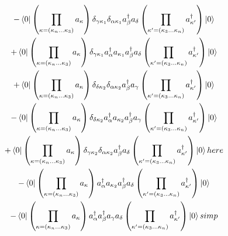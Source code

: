 \documentclass[12pt]{article}
\begin{document}
\begin{multline}
    -\bra{0}\left(\prod_{\kappa=\left(\kappa_{n}\dots\kappa_{3}\right)}a_{\kappa}\right)
        \delta_{\gamma\kappa_{1}}\delta_{\alpha\kappa_{1}}a^{\dag}_{\beta}a_{\delta}
    \left(\prod_{\kappa^{\prime}=\left(\kappa_{3}\dots\kappa_{n}\right)}a^{\dag}_{\kappa^{\prime}}\right)\ket{0}\\
    +\bra{0}\left(\prod_{\kappa=\left(\kappa_{n}\dots\kappa_{3}\right)}a_{\kappa}\right)
        \delta_{\gamma\kappa_{1}}a^{\dag}_{\alpha}a_{\kappa_{1}}a^{\dag}_{\beta}a_{\delta}
    \left(\prod_{\kappa^{\prime}=\left(\kappa_{3}\dots\kappa_{n}\right)}a^{\dag}_{\kappa^{\prime}}\right)\ket{0}\\
    +\bra{0}\left(\prod_{\kappa=\left(\kappa_{n}\dots\kappa_{3}\right)}a_{\kappa}\right)
        \delta_{\delta\kappa_{2}}\delta_{\alpha\kappa_{2}}a^{\dag}_{\beta}a_{\gamma}
    \left(\prod_{\kappa^{\prime}=\left(\kappa_{3}\dots\kappa_{n}\right)}a^{\dag}_{\kappa^{\prime}}\right)\ket{0}\\
    -\bra{0}\left(\prod_{\kappa=\left(\kappa_{n}\dots\kappa_{3}\right)}a_{\kappa}\right)
        \delta_{\delta\kappa_{2}}a^{\dag}_{\alpha}a_{\kappa_{2}}a^{\dag}_{\beta}a_{\gamma}
    \left(\prod_{\kappa^{\prime}=\left(\kappa_{3}\dots\kappa_{n}\right)}a^{\dag}_{\kappa^{\prime}}\right)\ket{0}\\
    +\bra{0}\left(\prod_{\kappa=\left(\kappa_{n}\dots\kappa_{3}\right)}a_{\kappa}\right)
        \delta_{\gamma\kappa_{2}}\delta_{\alpha\kappa_{2}}a^{\dag}_{\beta}a_{\delta}
    \left(\prod_{\kappa^{\prime}=\left(\kappa_{3}\dots\kappa_{n}\right)}a^{\dag}_{\kappa^{\prime}}\right)\ket{0}here\\
    -\bra{0}\left(\prod_{\kappa=\left(\kappa_{n}\dots\kappa_{3}\right)}a_{\kappa}\right)
        a^{\dag}_{\alpha}a_{\kappa_{2}}a^{\dag}_{\beta}a_{\delta}
    \left(\prod_{\kappa^{\prime}=\left(\kappa_{3}\dots\kappa_{n}\right)}a^{\dag}_{\kappa^{\prime}}\right)\ket{0}\\
    -\bra{0}\left(\prod_{\kappa=\left(\kappa_{n}\dots\kappa_{3}\right)}a_{\kappa}\right)
        a^{\dag}_{\alpha}a^{\dag}_{\beta}a_{\gamma}a_{\delta}
    \left(\prod_{\kappa^{\prime}=\left(\kappa_{3}\dots\kappa_{n}\right)}a^{\dag}_{\kappa^{\prime}}\right)\ket{0}
    simp
\end{multline}
\end{document}
